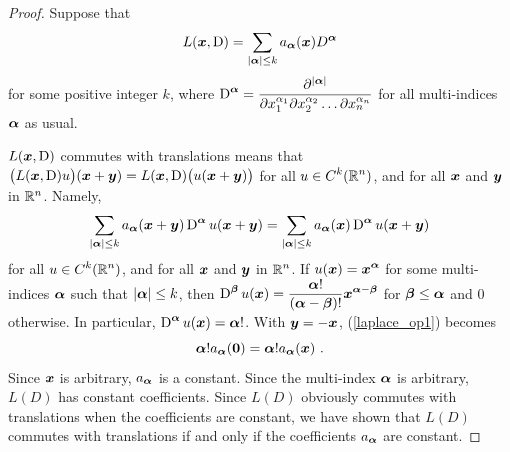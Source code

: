 \begin{proof}
\stage{$\Rightarrow$}
Suppose that
\[
L({\bm{x}},\operatorname{D}) = \sum_{|{\bm{\alpha}}|\leq k}
a_{{\bm{\alpha}}}({\bm{x}}) D^{{\bm{\alpha}}}
\]
for some positive integer $k$, where
$\displaystyle \operatorname{D}^{{\bm{\alpha}}}
= \frac{\partial^{|{\bm{\alpha}}|}}{\partial x_1^{\alpha_1}
\partial x_2^{\alpha_2} \ldots \partial x_n^{\alpha_n}}$ for all
multi-indices ${\bm{\alpha}}$ as usual.

$L({\bm{x}},\operatorname{D})$ commutes with translations means that
$\displaystyle \big(L({\bm{x}},\operatorname{D})u\big)({\bm{x}}+{\bm{y}}) =
L({\bm{x}},\operatorname{D})\big( u({\bm{x}}+{\bm{y}}) \big)$ for all
$\displaystyle u\in C^k(\mathbb{R}^n)$, and for
all ${\bm{x}}$ and ${\bm{y}}$ in $\mathbb{R}^n$.  Namely,
\begin{align} \label{laplace_op1}
\sum_{|{\bm{\alpha}}|\leq k} a_{{\bm{\alpha}}}({\bm{x}}+{\bm{y}})
\operatorname{D}^{{\bm{\alpha}}} u({\bm{x}}+{\bm{y}})
= \sum_{|{\bm{\alpha}}|\leq k} a_{{\bm{\alpha}}}({\bm{x}})
\operatorname{D}^{{\bm{\alpha}}} u({\bm{x}}+{\bm{y}})
\end{align}
for all $\displaystyle u\in C^k(\mathbb{R}^n)$, and for all ${\bm{x}}$ and
${\bm{y}}$ in $\displaystyle \mathbb{R}^n$.  If
$\displaystyle u({\bm{x}}) = {\bm{x}}^{{\bm{\alpha}}}$ for some multi-indices
${\bm{\alpha}}$ such that $|{\bm{\alpha}}|\leq k$, then
$\displaystyle \operatorname{D}^{{\bm{\beta}}} u({\bm{x}})
= \frac{{\bm{\alpha}}!}{({\bm{\alpha}}-{\bm{\beta}})!}
{\bm{x}}^{{\bm{\alpha}}-{\bm{\beta}}}$
for ${\bm{\beta}} \leq {\bm{\alpha}}$ and $0$ otherwise.  In particular,
$\displaystyle \operatorname{D}^{{\bm{\alpha}}} u({\bm{x}}) = {\bm{\alpha}}!$.  With
${\bm{y}} = - {\bm{x}}$, (\ref{laplace_op1}) becomes
\[
{\bm{\alpha}}! a_{{\bm{\alpha}}}({\bm{0}})
= {\bm{\alpha}}! a_{{\bm{\alpha}}}({\bm{x}}) \ .
\]
Since ${\bm{x}}$ is arbitrary, $a_{{\bm{\alpha}}}$ is a constant.
Since the multi-index ${\bm{\alpha}}$ is arbitrary, $L(D)$ has constant
coefficients.  Since $L(D)$ obviously commutes with translations when
the coefficients are constant, we have shown that $L(D)$ commutes with
translations if and only if the coefficients $a_{{\bm{\alpha}}}$ are constant.


\end{proof}
